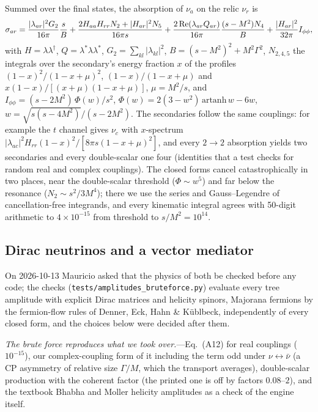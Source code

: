 \documentclass[11pt,a4paper]{article}
\newcommand{\file}[1]{\nolinkurl{#1}}
\begin{document}
Summed over the final states, the absorption of $\nu_a$ on the relic $\nu_r$ is
\begin{equation}
\sigma_{ar} = \frac{|\lambda_{ar}|^2 G_2}{16\pi}\frac{s}{B} + \frac{2H_{aa}H_{rr}N_2 + |H_{ar}|^2 N_5}{16\pi s}
 + \frac{2\,{\rm Re}(\lambda_{ar}Q_{ar})}{16\pi}\frac{(s - M^2)N_4}{B} + \frac{|H_{ar}|^2}{32\pi}I_{\phi\phi},
\label{eq:si_sigma}
\end{equation}
with $H = \lambda\lambda^\dagger$, $Q = \lambda^*\lambda\lambda^*$, $G_2 = \sum_{kl}|\lambda_{kl}|^2$,
$B = (s-M^2)^2 + M^2\Gamma^2$, $N_{2,4,5}$ the integrals over the
secondary's energy fraction $x$ of the profiles $(1-x)^2/(1-x+\mu)^2$, $(1-x)/(1-x+\mu)$ and
$x(1-x)/[(x+\mu)(1-x+\mu)]$, $\mu = M^2/s$, and
$I_{\phi\phi} = (s - 2M^2)\,\Phi(w)/s^2$, $\Phi(w) = 2(3 - w^2)\,\mathrm{artanh}\,w - 6w$,
$w = \sqrt{s(s - 4M^2)}/(s - 2M^2)$. The secondaries follow the same couplings: for example the $t$
channel gives $\nu_c$ with $x$-spectrum $|\lambda_{ac}|^2H_{rr}(1-x)^2/[8\pi s(1-x+\mu)^2]$, and every
$2\to2$ absorption yields two secondaries and every double-scalar one four (identities that a test
checks for random real and complex couplings). The closed forms cancel catastrophically in two places, near the
double-scalar threshold ($\Phi\sim w^5$) and far below the resonance ($N_2\sim s^2/3M^4$); there
we use the series and Gauss--Legendre of cancellation-free integrands, and every kinematic integral
agrees with 50-digit arithmetic to $4\times10^{-15}$ from threshold to $s/M^2 = 10^{14}$.

\subsection{Dirac neutrinos and a vector mediator}
\label{sec:si_dirac_vector}

On 2026-10-13 Mauricio asked that the physics of both be checked before any code; the checks
(\file{tests/amplitudes_bruteforce.py}) evaluate every tree amplitude with explicit Dirac matrices
and helicity spinors, Majorana fermions by the fermion-flow rules of Denner, Eck, Hahn \&
K\"ublbeck, independently of every closed form, and the choices below were decided after them.

\textit{The brute force reproduces what we took over.}---Eq.~(A12) for real couplings
($10^{-15}$), our complex-coupling form of it including the term odd under $\nu\leftrightarrow\bar\nu$
(a CP asymmetry of relative size $\Gamma/M$, which the transport averages), double-scalar
production with the coherent factor (the printed one is off by factors $0.08$--$2$), and the textbook
Bhabha and Moller helicity amplitudes as a check of the engine itself.
\end{document}
